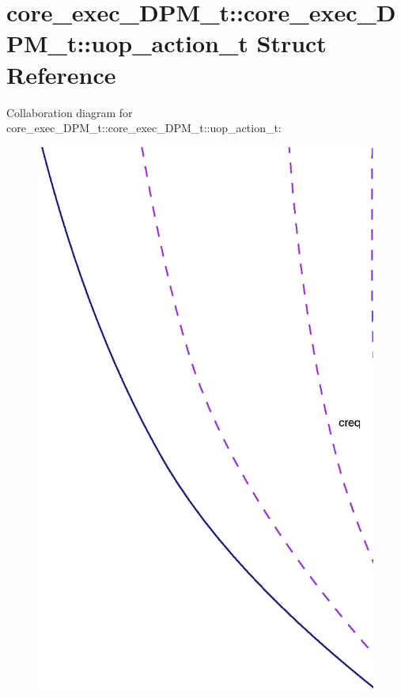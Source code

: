 \section{core\_\-exec\_\-DPM\_\-t::core\_\-exec\_\-DPM\_\-t::uop\_\-action\_\-t Struct Reference}
\label{structcore__exec__DPM__t_1_1uop__action__t}
Collaboration diagram for core\_\-exec\_\-DPM\_\-t::core\_\-exec\_\-DPM\_\-t::uop\_\-action\_\-t:\nopagebreak
\begin{figure}[H]
\begin{center}
\leavevmode
\includegraphics[width=400pt]{structcore__exec__DPM__t_1_1uop__action__t__coll__graph}
\end{center}
\end{figure}
